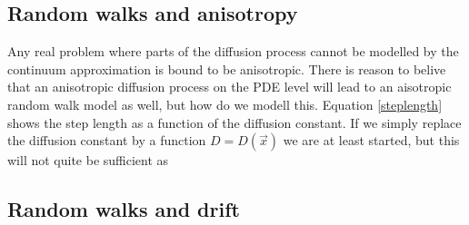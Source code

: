 \subsection{Random walks and anisotropy}\label{random_walks_and_anisotropy}

Any real problem where parts of the diffusion process cannot be modelled by the continuum approximation is bound to be anisotropic. 
There is reason to belive that an anisotropic diffusion process on the PDE level will lead to an aisotropic random walk model as well, but how do we modell this. 
Equation \ref{steplength} shows the step length as a function of the diffusion constant. 
If we simply replace the diffusion constant by a function $D = D(\vec{x})$ we are at least started, but this will not quite be sufficient as 

\subsection{Random walks and drift}\label{random_walks_and_drift}

